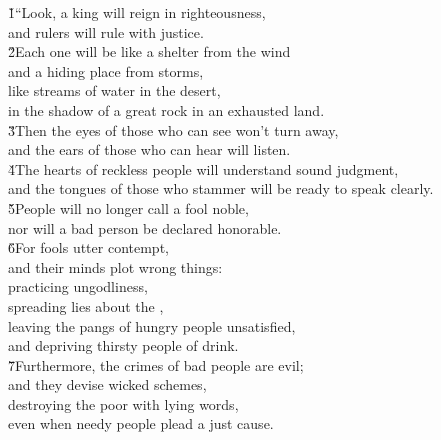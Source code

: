 \begin{poetry}
\poeml {}
\v{1}``Look, a king will reign in righteousness, \\
\poemll    and rulers will rule with justice. \\
\poeml \v{2}Each one will be like a shelter from the wind \\
\poemll    and a hiding place from storms, \\
\poeml like streams of water in the desert, \\
\poemll    in the shadow of a great rock in an exhausted land. \\
\poeml \v{3}Then the eyes of those who can see won't turn away, \\
\poemll    and the ears of those who can hear will listen. \\
\poeml \v{4}The hearts of reckless people will understand sound judgment, \\
\poemll    and the tongues of those who stammer will be ready to speak clearly. \\
\poeml \v{5}People will no longer call a fool noble, \\
\poemll    nor will a bad person be declared honorable. \\
\poeml \v{6}For fools utter contempt, \\
\poemll    and their minds plot wrong things: \\
\poeml practicing ungodliness, \\
\poemll    spreading lies about the , \\
\poeml leaving the pangs of hungry people unsatisfied, \\
\poemll    and depriving thirsty people of drink. \\
\poeml \v{7}Furthermore, the crimes of bad people are evil; \\
\poemll    and they devise wicked schemes, \\
\poeml destroying the poor with lying words, \\
\poemll    even when needy people plead a just cause. \\

\end{poetry}
